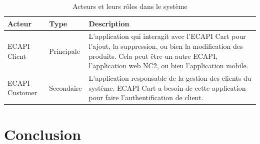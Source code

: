 \begin{table}[H]
    \hspace{-1cm}
    \begin{tabular}{ |m{4cm}| m{3cm}| m{10cm} |}
    \hline
     Acteur & Type & Description\\ 
    \hline
    ECAPI Client 
        & Principale
         &
         L'application qui interagit avec l’ECAPI Cart pour l’ajout, la suppression, ou bien la modification des produits. Cela peut être un autre ECAPI, l’application web NC2, ou bien l'application mobile. \\
    \hline
    ECAPI Customer 
    
        & Secondaire 
        &
        L’application responsable de la gestion des clients du système. ECAPI Cart a besoin de cette application pour faire l’authentification de client.
        \\
    \hline
    \end{tabular}
    \caption{Acteurs et leurs rôles dans le système}
\end{table}

\section*{Conclusion}





